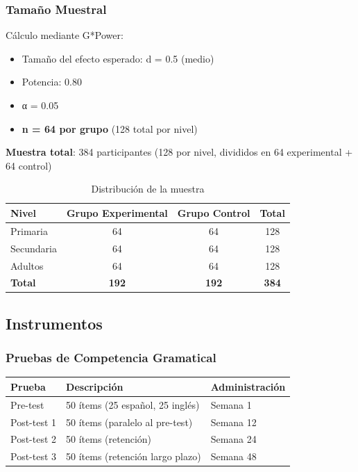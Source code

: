 \documentclass[12pt,a4paper]{article}
\begin{document}
\subsubsection{Tamaño Muestral}

Cálculo mediante G*Power:
\begin{itemize}
    \item Tamaño del efecto esperado: d = 0.5 (medio)
    \item Potencia: 0.80
    \item α = 0.05
    \item \textbf{n = 64 por grupo} (128 total por nivel)
\end{itemize}

\textbf{Muestra total}: 384 participantes (128 por nivel, divididos en 64 experimental + 64 control)

\begin{table}[H]
\centering
\caption{Distribución de la muestra}
\begin{tabular}{|l|c|c|c|}
\hline
\textbf{Nivel} & \textbf{Grupo Experimental} & \textbf{Grupo Control} & \textbf{Total} \\
\hline
Primaria & 64 & 64 & 128 \\
Secundaria & 64 & 64 & 128 \\
Adultos & 64 & 64 & 128 \\
\hline
\textbf{Total} & \textbf{192} & \textbf{192} & \textbf{384} \\
\hline
\end{tabular}
\end{table}

\subsection{Instrumentos}

\subsubsection{Pruebas de Competencia Gramatical}

\begin{table}[H]
\centering
\begin{tabular}{|l|l|l|}
\hline
\textbf{Prueba} & \textbf{Descripción} & \textbf{Administración} \\
\hline
Pre-test & 50 ítems (25 español, 25 inglés) & Semana 1 \\
Post-test 1 & 50 ítems (paralelo al pre-test) & Semana 12 \\
Post-test 2 & 50 ítems (retención) & Semana 24 \\
Post-test 3 & 50 ítems (retención largo plazo) & Semana 48 \\
\hline
\end{tabular}
\end{table}
\end{document}

